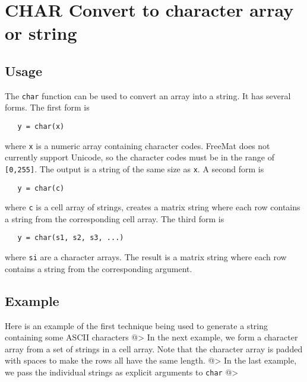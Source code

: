 \section{CHAR Convert to character array or string}

\subsection{Usage}

The \verb|char| function can be used to convert an array
into a string.  It has several forms.  The first form
is
\begin{verbatim}
   y = char(x)
\end{verbatim}
where \verb|x| is a numeric array containing character codes.
FreeMat does not currently support Unicode, so the
character codes must be in the range of \verb|[0,255]|.  The
output is a string of the same size as \verb|x|.  A second
form is
\begin{verbatim}
   y = char(c)
\end{verbatim}
where \verb|c| is a cell array of strings, creates a matrix string
where each row contains a string from the corresponding cell array.
The third form is
\begin{verbatim}
   y = char(s1, s2, s3, ...)
\end{verbatim}
where \verb|si| are a character arrays.  The result is a matrix string
where each row contains a string from the corresponding argument.
\subsection{Example}

Here is an example of the first technique being used to generate
a string containing some ASCII characters
@>
In the next example, we form a character array from a set of
strings in a cell array.  Note that the character array is padded
with spaces to make the rows all have the same length.
@>
In the last example, we pass the individual strings as explicit
arguments to \verb|char|
@>
